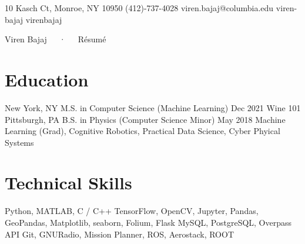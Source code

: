 \documentclass{simple_resume}[2020/07/29]
\begin{document}
           {10 Kasch Ct, Monroe, NY 10950} %
           {(412)-737-4028} %
           {viren.bajaj@columbia.edu} %
           {viren-bajaj} %
           {virenbajaj} %

\makefooter{\today}
           {Viren Bajaj~~~·~~~Résumé}
           {\thepage}
\section{Education}
               {New York, NY} %
               {M.S. in Computer Science (Machine Learning)} %
               {Dec 2021} %
               {Wine 101} %
\vspace{-1ex}               
               {Pittsburgh, PA} %
               {B.S. in Physics (Computer Science Minor)} %
               {May 2018} %
               {Machine Learning (Grad), Cognitive Robotics, Practical Data Science, Cyber Phyical Systems} %

\section{Technical Skills}

\begin{skills}
      {Python, MATLAB, C / C++}
      {TensorFlow, OpenCV, Jupyter, Pandas, GeoPandas,                             Matplotlib, seaborn, Folium, Flask}
       {MySQL, PostgreSQL, Overpass API}
     {Git, GNURadio, Mission Planner, ROS, Aerostack,                             ROOT}
\end{skills}
\vspace{-1.5ex}
\end{document}
